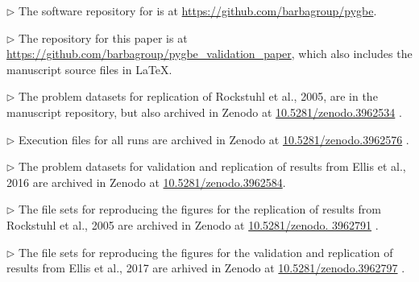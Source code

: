 \begin{compactitem}

\item[$\triangleright$] The software repository for \pygbe is at \href{https://github.com/barbagroup/pygbe}{https://github.com/barbagroup/pygbe}.

\item[$\triangleright$] The repository for this paper is at \href{https://github.com/barbagroup/pygbe_validation_paper}{https://github.com/barbagroup/pygbe\_validation\_paper}, which also includes the manuscript source files in LaTeX.

\item[$\triangleright$] The problem datasets for replication of Rockstuhl et al., 2005, are in the manuscript repository, but also archived in Zenodo  at \href{https://doi.org/10.5281/zenodo.3962534}{10.5281/zenodo.3962534}  \cite{ClementiBarba2020-Zen_a}.

\item[$\triangleright$] Execution files for all runs are archived in Zenodo at \href{https://doi.org/10.5281/zenodo.3962576}{10.5281/zenodo.3962576} \cite{ClementiBarba2020-Zen_b}.

\item[$\triangleright$] The problem datasets for validation and replication of results from Ellis et al., 2016 are archived in Zenodo at \href{https://doi.org/10.5281/zenodo.3962584}{10.5281/zenodo.3962584}\cite{ClementiBarba2020-Zen_c}.

\item[$\triangleright$] The file sets for reproducing the figures for the replication of results from Rockstuhl et al., 2005 are archived in Zenodo at \href{https://doi.org/10.5281/zenodo. 3962791}{10.5281/zenodo. 3962791} \cite{ClementiBarba2020-Zen_d}.

\item[$\triangleright$] The file sets for reproducing the figures for the validation and replication of results from Ellis et al., 2017 are arhived in Zenodo at \href{https://doi.org/3962797/zenodo.3962791}{10.5281/zenodo.3962797} \cite{ClementiBarba2020-Zen_e}.

\end{compactitem}
